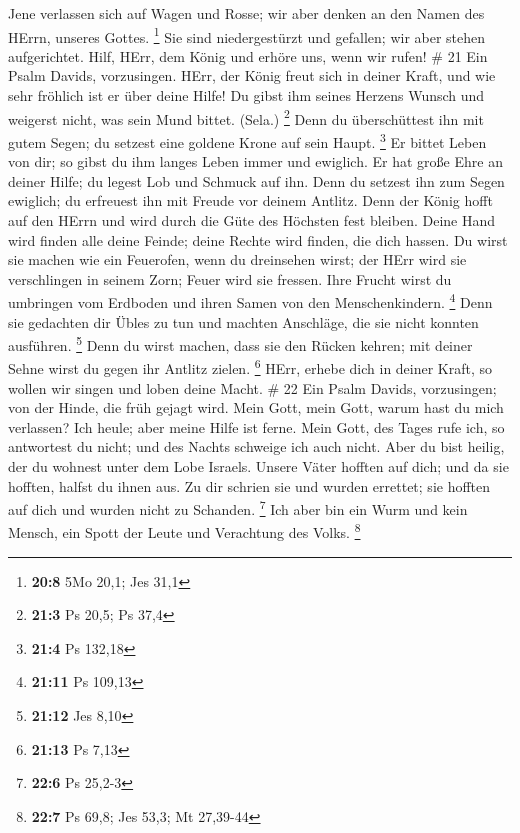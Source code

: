  Jene verlassen sich auf Wagen und Rosse; wir aber denken an
den Namen des HErrn, unseres Gottes. \footnote{\textbf{20:8} 5Mo 20,1;
  Jes 31,1}  Sie sind niedergestürzt und gefallen; wir aber
stehen aufgerichtet.  Hilf, HErr, dem König und erhöre uns,
wenn wir rufen! \# 21  Ein Psalm Davids, vorzusingen.
 HErr, der König freut sich in deiner Kraft, und wie sehr
fröhlich ist er über deine Hilfe!  Du gibst ihm seines
Herzens Wunsch und weigerst nicht, was sein Mund bittet. (Sela.)
\footnote{\textbf{21:3} Ps 20,5; Ps 37,4}  Denn du
überschüttest ihn mit gutem Segen; du setzest eine goldene Krone auf
sein Haupt. \footnote{\textbf{21:4} Ps 132,18}  Er bittet
Leben von dir; so gibst du ihm langes Leben immer und ewiglich.
 Er hat große Ehre an deiner Hilfe; du legest Lob und
Schmuck auf ihn.  Denn du setzest ihn zum Segen ewiglich; du
erfreuest ihn mit Freude vor deinem Antlitz.  Denn der König
hofft auf den HErrn und wird durch die Güte des Höchsten fest bleiben.
 Deine Hand wird finden alle deine Feinde; deine Rechte wird
finden, die dich hassen.  Du wirst sie machen wie ein
Feuerofen, wenn du dreinsehen wirst; der HErr wird sie verschlingen in
seinem Zorn; Feuer wird sie fressen.  Ihre Frucht wirst du
umbringen vom Erdboden und ihren Samen von den Menschenkindern.
\footnote{\textbf{21:11} Ps 109,13}  Denn sie gedachten dir
Übles zu tun und machten Anschläge, die sie nicht konnten ausführen.
\footnote{\textbf{21:12} Jes 8,10}  Denn du wirst machen,
dass sie den Rücken kehren; mit deiner Sehne wirst du gegen ihr Antlitz
zielen. \footnote{\textbf{21:13} Ps 7,13}  HErr, erhebe
dich in deiner Kraft, so wollen wir singen und loben deine Macht. \# 22
 Ein Psalm Davids, vorzusingen; von der Hinde, die früh
gejagt wird.  Mein Gott, mein Gott, warum hast du mich
verlassen? Ich heule; aber meine Hilfe ist ferne.  Mein
Gott, des Tages rufe ich, so antwortest du nicht; und des Nachts
schweige ich auch nicht.  Aber du bist heilig, der du
wohnest unter dem Lobe Israels.  Unsere Väter hofften auf
dich; und da sie hofften, halfst du ihnen aus.  Zu dir
schrien sie und wurden errettet; sie hofften auf dich und wurden nicht
zu Schanden. \footnote{\textbf{22:6} Ps 25,2-3}  Ich aber
bin ein Wurm und kein Mensch, ein Spott der Leute und Verachtung des
Volks. \footnote{\textbf{22:7} Ps 69,8; Jes 53,3; Mt 27,39-44}

